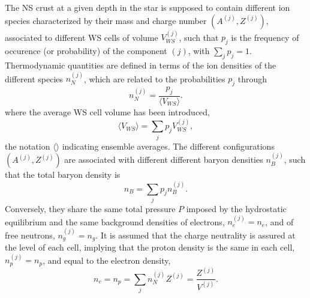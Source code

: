 The NS crust at a given depth in the star is supposed to contain different ion
species characterized by their mass and charge number $(A^{(j)},Z^{(j)})$, 
associated to different WS cells of volume $V_{WS}^{(j)}$, such that $p_j$ is 
the frequency of occurence (or probability) of the component $(j)$, with 
$\sum_j p_j = 1$.
Thermodynamic quantities are defined in terms of the ion densities of the 
different species $n_N^{(j)}$, which are related to the probabilities $p_j$ 
through 
%
\begin{equation}
  n_N^{(j)}=\frac{p_j}{\langle V_{WS}\rangle}.\label{eq:nnj}
\end{equation}
%
where the average WS cell volume has been introduced,
%
\begin{equation}
  \langle V_{WS} \rangle = \sum_j p_j V_{WS}^{(j)},
\end{equation}
%
the notation $\langle\rangle$ indicating ensemble averages.
The different configurations $(A^{(j)},Z^{(j)})$ are associated with different
different baryon densities $n_B^{(j)}$, such that the total baryon density is
%
\begin{equation}
  n_B = \sum_j p_j n_B^{(j)}.
\end{equation}
%
Conversely, they share the same total pressure $P$ imposed by the hydrostatic 
equilibrium and the same background densities of electrons, $n_e^{(j)}=n_e$, 
and of free neutrons, $n_g^{(j)}=n_g$.
It is assumed that the charge neutrality is assured at the level of each cell,
implying that the proton density is the same in each cell, $n_p^{(j)}=n_p$, and
equal to the electron density, 
%
\begin{equation}
  n_e = n_p = \sum_j n_N^{(j)} Z^{(j)} =
  \frac{Z^{(j)}}{V^{(j)}}.\label{eq:chargeneut}
\end{equation}

